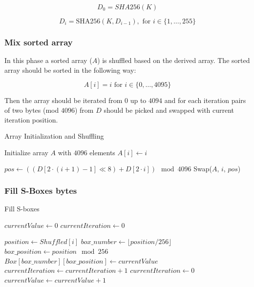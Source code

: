 \documentclass{article} %
\begin{document}
\begin{equation}
  D_0 = SHA256(K)
\end{equation}

\begin{equation}
  D_i = \text{SHA256}(K, D_{i-1}), \text{ for } i \in \{1, \ldots, 255\}
\end{equation}

\subsubsection{Mix sorted array}
In this phase a sorted array ($A$) is shuffled based on the derived array.
The sorted array should be sorted in the following way:

\begin{equation}
  A[i] = i \text{ for } i \in \{0, \ldots, 4095\}
\end{equation}

Then the array should be iterated from $0$ up to $4094$ and for each iteration pairs of two bytes (mod $4096$) from $D$ should be picked and swapped with current iteration position.

\begin{algorithm}[H]
  \caption{Array Initialization and Shuffling}
  \begin{algorithmic}[1]
  \State Initialize array $A$ with $4096$ elements
      \State $A[i] \gets i$
  \EndFor
  
      \State $pos \gets ((D[2 \cdot (i+1) - 1] \ll 8) + D[2 \cdot i]) \mod 4096$
      \State Swap($A$, $i$, $pos$)
  \EndFor
  \end{algorithmic}
\end{algorithm}


\subsubsection{Fill S-Boxes bytes}

\begin{algorithm}[H]
  \caption{Fill S-boxes}
  \begin{algorithmic}[1]

    \State $currentValue \gets 0$
    \State $currentIteration \gets 0$

      \State $position \gets Shuffled[i]$
      \State $box\_number \gets \lfloor position / 256 \rfloor$
      \State $box\_position \gets position \mod 256$
      \State $Box[box\_number][box\_position] \gets currentValue$
      \State $currentIteration \gets currentIteration + 1$
          \State $currentIteration \gets 0$
          \State $currentValue \gets currentValue + 1$
      \EndIf
    \EndFor

  \end{algorithmic}
\end{algorithm} 
\end{document}
